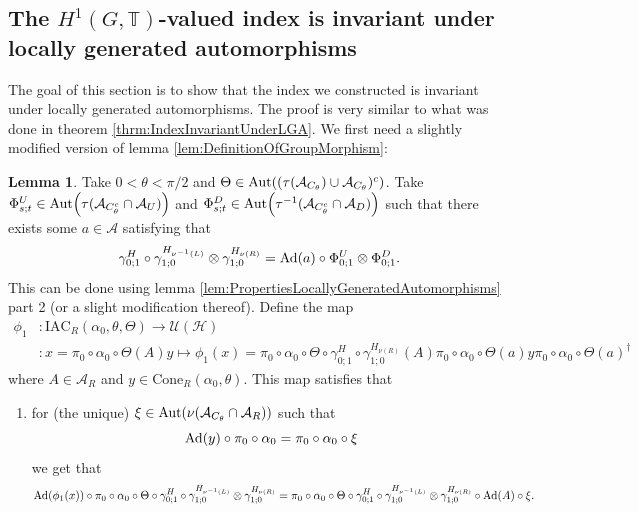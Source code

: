 \documentclass[12pt,a4paper,twoside]{article}
\newcommand{\IAC}{\textrm{IAC}}
\let\originalleft\left
\let\originalright\right
\renewcommand{\left}{\mathopen{}\mathclose\bgroup\originalleft}
\renewcommand{\right}{\aftergroup\egroup\originalright}
\newcommand{\UU}{\mathcal U}
\newcommand{\HH}{\mathcal H}
\newcommand{\TT}{\mathbb T}
\renewcommand{\AA}{\mathcal A}
\newcommand{\Ad}[1]{\textrm{Ad}\left(#1\right)}
\newcommand{\Aut}[1]{\textrm{Aut}\left(#1\right)}
\theoremstyle{definition}
\newtheorem{lemma}[theorem]{Lemma}
\numberwithin{equation}{section}
\begin{document}
\subsection{The $H^1(G,\TT)$-valued index is invariant under locally generated automorphisms}
The goal of this section is to show that the index we constructed is invariant under locally generated automorphisms. The proof is very similar to what was done in theorem \ref{thrm:IndexInvariantUnderLGA}. We first need a slightly modified version of lemma \ref{lem:DefinitionOfGroupMorphism}:
\begin{lemma}\label{lem:DefinitionOfGroupMorphismTwoTranslations}
	Take $0<\theta<\pi/2$ and $\Theta\in \Aut{(\tau(\AA_{C_\theta})\cup\AA_{C_\theta})^c}$. Take $\Phi^U_{s;t}\in\Aut{\tau(\AA_{C_\theta^c}\cap\AA_{U})}$ and $\Phi^D_{s;t}\in\Aut{\tau^{-1}(\AA_{C_\theta^c}\cap\AA_{D})}$ such that there exists some $a\in\AA$ satisfying that
	\begin{equation}\label{eq:DefinitionOfGroupMorphismHAutEquationTwoTranslations}
		\gamma^H_{0;1}\circ\gamma^{H_{\nu^{-1}(L)}}_{1;0}\otimes\gamma^{H_{\nu(R)}}_{1;0}=\Ad{a}\circ \Phi^U_{0;1}\otimes\Phi^D_{0;1}.
	\end{equation}
	This can be done using lemma \ref{lem:PropertiesLocallyGeneratedAutomorphisms} part 2 (or a slight modification thereof). Define the map
	\begin{align}
		\phi_1&:\IAC_{R}(\alpha_0,\theta,\Theta) \rightarrow \UU(\HH)\\
		\nonumber
		&:x=\pi_0\circ\alpha_0\circ\Theta(A)y\mapsto \phi_1(x)=\pi_0\circ\alpha_0\circ\Theta\circ\gamma^H_{0;1}\circ\gamma^{H_{\nu(R)}}_{1;0}(A)\pi_0\circ\alpha_0\circ\Theta(a)y\pi_0\circ\alpha_0\circ\Theta(a)^\dagger
	\end{align}
	where $A\in\AA_{R}$ and $y\in\textrm{Cone}_{R}(\alpha_0,\theta)$. This map satisfies that
	\begin{enumerate}
		\item  for (the unique) $\xi\in\Aut{\nu(\AA_{C_\theta}\cap\AA_R)}$ such that
		\begin{equation}
			\Ad{y}\circ\pi_0\circ\alpha_0=\pi_0\circ\alpha_0\circ\xi
		\end{equation}
		we get that
		\begin{equation}\label{eq:ConditionDefinitionOfGroupMorphismTwoTranslations}
			\Ad{\phi_1(x)}\circ\pi_0\circ\alpha_0\circ\Theta\circ\gamma^H_{0;1}\circ\gamma^{H_{\nu^{-1}(L)}}_{1;0}\otimes\gamma^{H_{\nu(R)}}_{1;0}=\pi_0\circ\alpha_0\circ\Theta\circ\gamma^H_{0;1}\circ\gamma^{H_{\nu^{-1}(L)}}_{1;0}\otimes\gamma^{H_{\nu(R)}}_{1;0}\circ\Ad{A}\circ\xi.

\end{equation}
\end{enumerate}
\end{lemma}
\end{document}
